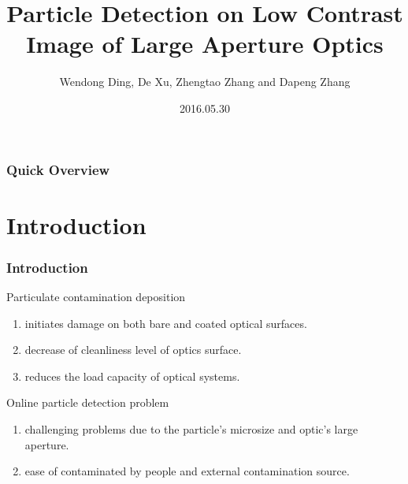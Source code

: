 \documentclass[14pt,hyperref={CJKbookmarks=true}]{beamer}
\theoremstyle{plain}
\theoremstyle{definition}
\theoremstyle{remark}
\begin{document}
\title[IACAS]{Particle Detection on Low Contrast Image of Large Aperture Optics}
\author{Wendong Ding, De Xu, Zhengtao Zhang and Dapeng Zhang}
\date[]{2016.05.30}
\begin{frame}
\titlepage
\end{frame}


\begin{frame}
\frametitle{Quick Overview} 
\large\tableofcontents
\end{frame}

\section{Introduction}
\begin{frame}
\frametitle{Introduction} 
\small
\begin{block}{Particulate contamination deposition}

\begin{enumerate}
\item initiates damage on both bare and coated optical surfaces.
\item decrease of cleanliness level of optics surface.
\item reduces the load capacity of optical systems.
\end{enumerate}
\end{block}

\begin{block}{Online particle detection problem}
\begin{enumerate}
\item challenging problems due to the particle's microsize and optic's large aperture.
\item ease of contaminated by people and external contamination source.
\end{enumerate}

\end{block}
\end{frame}
\end{document}

